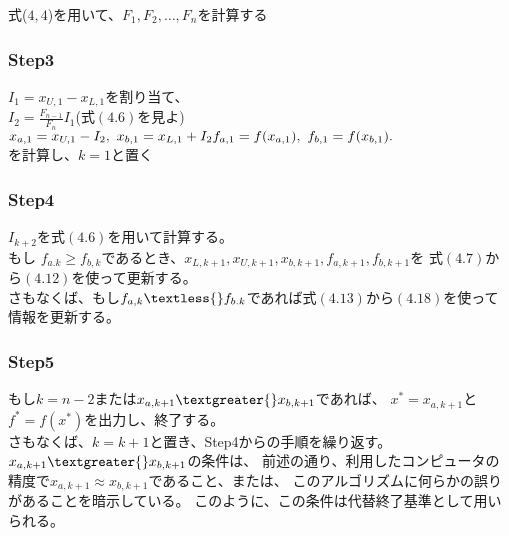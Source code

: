 式($4,4$)を用いて、$F_1, F_2, \dots ,
F_n$を計算する

\subsubsection*{Step3}\label{step3}

$I_1 = x_{U,1} -x_{L,1}$を割り当て、 \\
$I_2 = \frac{F_{n-1}}{F_n} I_1$(式$(4.6)$を見よ) \\
$
x_{a,1} = x_{U,1} - I_2, \ x_{b,1} = x_{L,1} + I_2 \\
f_{a,1} = f(x_{a,1}), \ f_{b,1} = f(x_{b,1}).
$ \\
を計算し、$k = 1$と置く

\subsubsection*{Step4}\label{step4}

$I_{k+2}$を式$(4.6)$を用いて計算する。 \\
もし $f_{a.k} \geq
f_{b,k}$であるとき、$x_{L,k+1},x_{U,k+1},x_{b,k+1},f_{a,k+1},f_{b,k+1}$を
式$(4.7)$から$(4.12)$を使って更新する。 \\
さもなくば、もし$f_{a,k} \textless{}
f_{b.k}$であれば式$(4.13)$から$(4.18)$を使って情報を更新する。

\subsubsection*{Step5}\label{step5}

もし$k = n - 2$または$x_{a,k+1} \textgreater{}
x_{b,k+1}$であれば、 $x^\ast =
x_{a,k+1}$と$f^\ast =
f(x^\ast)$を出力し、終了する。 \\
さもなくば、$k = k + 1$と置き、Step4からの手順を繰り返す。 \\
$x_{a,k+1} \textgreater{} x_{b,k+1}$の条件は、
前述の通り、利用したコンピュータの精度で$x_{a,k+1} \approx
x_{b,k+1}$であること、または、
このアルゴリズムに何らかの誤りがあることを暗示している。
このように、この条件は代替終了基準として用いられる。
